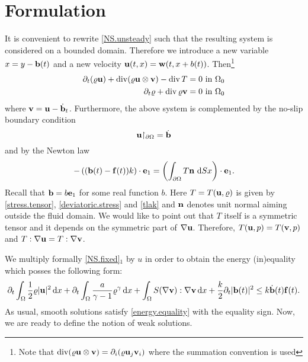 \documentclass{article}
\DeclareMathOperator{\diver}{div}
\newcommand{\dx}{\,\mathrm{d}x}
\newcommand{\bb}{{\bf b}}
\newcommand{\vb}{\bb}
\newcommand{\be}{{\bf e}}
\newcommand{\ve}{\be}
\newcommand{\bw}{{\bf w}}
\newcommand{\bn}{{\bf n}}
\newcommand{\bu}{{\bf u}}
\newcommand{\vu}{\bu}
\newcommand{\bv}{{\bf v}}
\newcommand{\vv}{\bv}
\newcommand{\pat}{\partial_t}
\numberwithin{equation}{section}
\begin{document}
\section{Formulation}
It is convenient to rewrite \eqref{NS.unsteady} such that the resulting system is considered on a bounded domain. Therefore we introduce a new variable $x = y-\bb(t)$ and a new velocity $\bu(t,x) = \bw(t,x+ b(t))$. Then\footnote{Note that $\diver(\varrho \bu \otimes \bv) = \partial_i(\varrho \bu_j \bv_i)$ where the summation convention is used}
\begin{equation}\label{NS.fixed}
\begin{split}
\pat (\varrho \bu) + \diver (\varrho \bu\otimes \bv) - \diver T & = 0 \ \mbox{in }\Omega_0\\
\pat \varrho + \diver \varrho \bv & = 0\ \mbox{in }\Omega_0
\end{split}
\end{equation} 
where $\bv = \bu-\dot\bb_t$. Furthermore, the above system is complemented by the no-slip boundary condition
\begin{equation}\label{no.slip.fixed}
\bu{\restriction_{\partial\Omega}} = \dot \bb
\end{equation}
and by the Newton law
\begin{equation}\label{NL.fixed}
-\left((\bb(t) - {\bf f}(t))k\right)\cdot \ve_1 = \left(\int_{\partial \Omega} T\bn\ {\rm d}Sx\right)\cdot\ve_1.
\end{equation}
Recall that $\vb = b \ve_1$ for some real function $b$.
Here $T = T(\vu,\varrho)$ is given by \eqref{stress.tensor}, \eqref{deviatoric.stress} and \eqref{tlak} and $\bn$ denotes unit normal aiming outside the fluid domain. We would like to point out that $T$ itself is a symmetric tensor and it depends on the symmetric part of $\nabla\vu$. Therefore, $T(\vu,p) = T(\vv,p)$ and $T:\nabla\vu = T:\nabla\vv$.

We multiply formally \eqref{NS.fixed}$_1$ by $u$ in order to obtain the energy (in)equality which posses the following form:
\begin{equation}\label{energy.equality}
\pat\int_{\Omega}\frac 12 \varrho |\bu|^2\dx + \pat \int_\Omega \frac a{\gamma-1} \varrho^\gamma \dx + \int_\Omega S(\nabla \bv):\nabla \bv \dx + \frac k2 \pat |\bb(t)|^2 \leq k \dot \bb (t) {\bf f}(t).
\end{equation}
As usual, smooth solutions satisfy \eqref{energy.equality} with the equality sign. Now, we are ready to define the notion of weak solutions.
\end{document}
